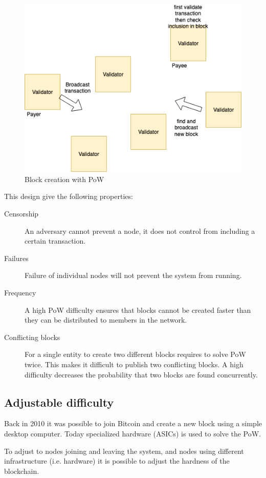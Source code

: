 \begin{figure}
	\includegraphics[width=\linewidth]{fig/NoLeader}
	\caption{Block creation with PoW}
	\label{fig:leader}
\end{figure}

This design give the following properties:
\begin{description}
	\item[Censorship] An adversary cannot prevent a node, it does not control from including a certain transaction.
	\item[Failures] Failure of individual nodes will not prevent the system from running.
	\item[Frequency] A high PoW difficulty ensures that blocks cannot be created faster than they can be distributed to members in the network.
	\item[Conflicting blocks] For a single entity to create two different blocks requires to solve PoW twice. This makes it difficult to publish two conflicting blocks.
	A high difficulty decreases the probability that two blocks are found concurrently.
\end{description}

\subsection{Adjustable difficulty}
Back in 2010 it was possible to join Bitcoin and create a new block using a simple desktop computer. Today specialized hardware (ASICs) is used to solve the PoW.
\begin{idea} To adjust to nodes joining and leaving the system, and nodes using different infrastructure (i.e. hardware) it is possible to adjust the hardness of the blockchain.
\end{idea}

